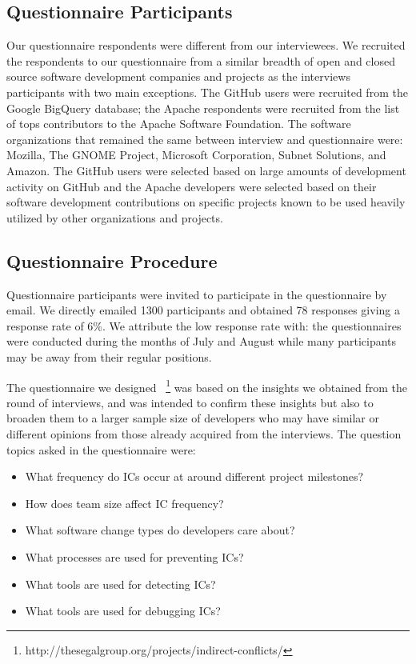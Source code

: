 \documentclass[conference]{IEEEtran}
\begin{document}
\subsection{Questionnaire Participants}

Our questionnaire respondents were different from our interviewees. We recruited the respondents to our questionnaire from a similar
breadth of open and closed source software development
companies and projects as the interviews participants with two main exceptions. The GitHub users were recruited from the Google BigQuery database; the Apache respondents were recruited from the list of tops contributors to the Apache Software Foundation.
The software organizations that remained the same between interview and questionnaire were: Mozilla, The GNOME Project, Microsoft Corporation,
Subnet Solutions, and Amazon. The GitHub
users were selected based on large amounts of development activity on GitHub and the Apache developers
were selected based on their software development contributions on specific projects known to be used heavily
utilized by other organizations and projects.

\subsection{Questionnaire Procedure}

Questionnaire participants were invited to participate in the questionnaire by email. We directly emailed 1300 participants and obtained 78 responses
giving a response rate of 6\%. We attribute the low response rate with: the questionnaires
were conducted during the months of July and August while many participants may be away from their regular positions.

The questionnaire we designed ~\footnote{http://thesegalgroup.org/projects/indirect-conflicts/}
was based on the insights we obtained from the round of interviews, and was intended to confirm these insights but also to broaden them to a larger sample size of developers who may have similar or different opinions from those already acquired from the interviews. The question topics asked in the questionnaire were:

\begin{itemize}
\item What frequency do ICs occur at around different project milestones?
\item How does team size affect IC frequency?
\item What software change types do developers care about?
\item What processes are used for preventing ICs?
\item What tools are used for detecting ICs?
\item What tools are used for debugging ICs?
\end{itemize}
\end{document}
